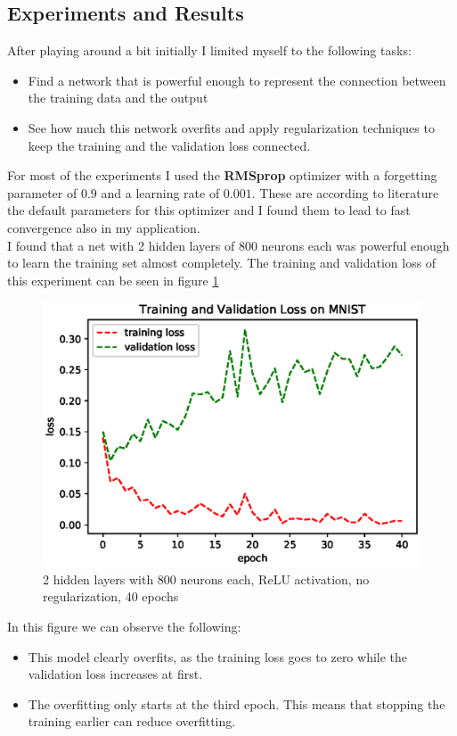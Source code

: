 \documentclass{scrartcl}
\begin{document}
\subsection*{Experiments and Results}
After playing around a bit initially I limited myself to the following tasks:
\begin{itemize}
	\item Find a network that is powerful enough to represent the connection between the training data and the output
	\item See how much this network overfits and apply regularization techniques to keep the training and the validation loss connected.
\end{itemize}
For most of the experiments I used the \textbf{RMSprop} optimizer with a forgetting parameter of $0.9$ and a learning rate of $0.001$. These are according to literature the default parameters for this optimizer and I found them to lead to fast convergence also in my application. \\
I found that a net with 2 hidden layers of 800 neurons each was powerful enough to learn the training set almost completely. The training and validation loss of this experiment can be seen in figure \ref{fig:noDropout}
\begin{figure}
	\centering
	\includegraphics[scale=0.7]{no_dropout.eps}
	\caption{2 hidden layers with 800 neurons each, ReLU activation, no regularization, 40 epochs}
	\label{fig:noDropout}
\end{figure}
In this figure we can observe the following:
\begin{itemize}
	\item This model clearly overfits, as the training loss goes to zero while the validation loss increases at first.
	\item The overfitting only starts at the third epoch. This means that stopping the training earlier can reduce overfitting.
\end{itemize}
\end{document}
